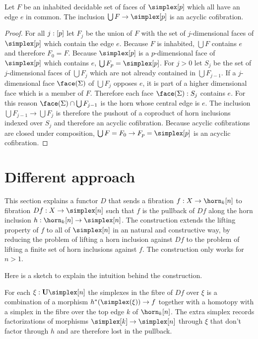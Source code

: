 \documentclass[csh.tex]{subfiles}
\begin{document}
\begin{lemma} Let $F$ be an inhabited decidable set of faces of $\simplex[p]$ which all have an edge $e$ in common. The inclusion $\bigcup F\to \simplex[p]$ is an acyclic cofibration. \label{face completion} \end{lemma}

\begin{proof} For all $j:[p]$ let $F_j$ be the union of $F$ with the set of $j$-dimensional faces of $\simplex[p]$ which contain the edge $e$. Because $F$ is inhabited, $\bigcup F$ contains $e$ and therefore $F_0=F$. Because $\simplex[p]$ is a $p$-dimensional face of $\simplex[p]$ which contains $e$, $\bigcup F_p = \simplex[p]$. For $j>0$ let $S_j$ be the set of $j$-dimensional faces of $\bigcup F_j$ which are not already contained in $\bigcup F_{j-1}$. If a $j$-dimensional face $\face(\Sigma)$ of $\bigcup F_j$ opposes $e$, it is part of a higher dimensional face which is a member of $F$. Therefore each face $\face(\Sigma)\of S_j$ contains $e$. For this reason $\face(\Sigma)\cap \bigcup F_{j-1}$ is the horn whose central edge is $e$. The inclusion $\bigcup F_{j-1}\to\bigcup F_j$ is therefore the pushout of a coproduct of horn inclusions indexed over $S_j$ and therefore an acyclic cofibration. Because acyclic cofibrations are closed under composition, $\bigcup F = F_0\to F_p = \simplex[p]$ is an acyclic cofibration. 
\end{proof}


\section{Different approach}
This section explains a functor $D$ that sends a fibration $f:X\to \horn_k[n]$ to fibration $Df:X\to\simplex[n]$ such that $f$ is the pullback of $Df$ along the horn inclusion $h\of\horn_k[n]\to\simplex[n]$. The construction extends the lifting property of $f$ to all of $\simplex[n]$ in an natural and constructive way, by reducing the problem of lifting a horn inclusion against $Df$ to the problem of lifting a finite set of horn inclusions against $f$. The construction only works for $n>1$. 

Here is a sketch to explain the intuition behind the construction.

For each $\xi\of \base\simplex[n]$ the simplexes in the fibre of $Df$ over $\xi$ is a combination of a morphism $h\ri(\simplex(\xi))\to f$ together with a homotopy with a simplex in the fibre over the top edge $k$ of $\horn_k[n]$. The extra simplex records factorizations of morphisms $\simplex[k]\to \simplex[n]$ through $\xi$ that don't factor through $h$ and are therefore lost in the pullback.
\end{document}
